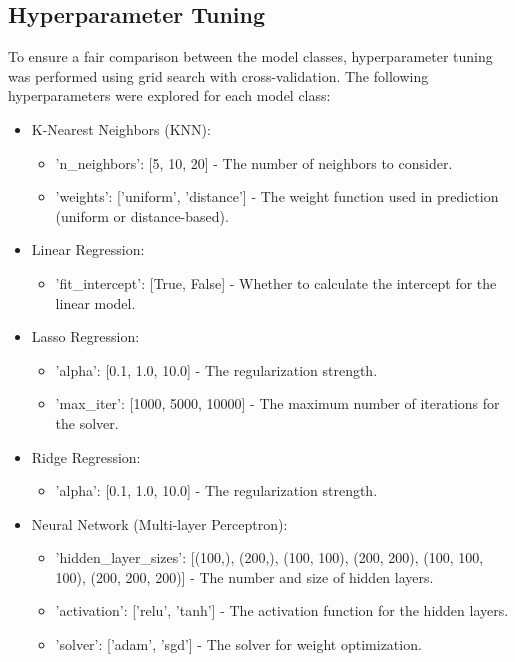 \documentclass{article}
\begin{document}
\subsection{Hyperparameter Tuning}
To ensure a fair comparison between the model classes, hyperparameter tuning was performed using grid search with cross-validation. The following hyperparameters were explored for each model class:
\begin{itemize}
   \item K-Nearest Neighbors (KNN):
   \begin{itemize}
       \item 'n\_neighbors': [5, 10, 20] - The number of neighbors to consider.
       \item 'weights': ['uniform', 'distance'] - The weight function used in prediction (uniform or distance-based).
   \end{itemize}
   
   \item Linear Regression:
   \begin{itemize}
       \item 'fit\_intercept': [True, False] - Whether to calculate the intercept for the linear model.
   \end{itemize}
   
   \item Lasso Regression:
   \begin{itemize}
       \item 'alpha': [0.1, 1.0, 10.0] - The regularization strength.
       \item 'max\_iter': [1000, 5000, 10000] - The maximum number of iterations for the solver.
   \end{itemize}
   
   \item Ridge Regression:
   \begin{itemize}
       \item 'alpha': [0.1, 1.0, 10.0] - The regularization strength.
   \end{itemize}
   
   \item Neural Network (Multi-layer Perceptron):
   \begin{itemize}
       \item 'hidden\_layer\_sizes': [(100,), (200,), (100, 100), (200, 200), (100, 100, 100), (200, 200, 200)] - The number and size of hidden layers.
       \item 'activation': ['relu', 'tanh'] - The activation function for the hidden layers.
       \item 'solver': ['adam', 'sgd'] - The solver for weight optimization.
   \end{itemize}
\end{itemize}
\end{document}
